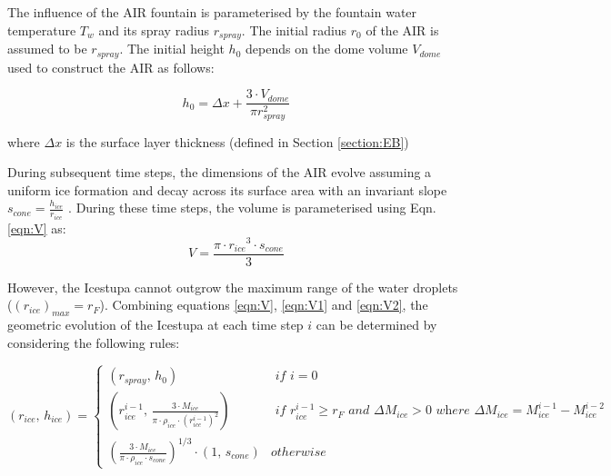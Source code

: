 \documentclass[utf8]{frontiersSCNS} %
\begin{document}
The influence of the AIR fountain is parameterised by the fountain water temperature $T_{w}$ and its spray radius $r_{spray}$.
The initial radius $r_0$ of the AIR is assumed to be $r_{spray}$. The initial height $h_0$ depends on the dome volume
$V_{dome}$ used to construct the AIR as follows:

\begin{equation} 
    h_{0} =  \Delta x + \frac{3 \cdot V_{dome}}{\pi r_{spray}^2 } 
  \end{equation}

where $\Delta x$ is the surface layer thickness (defined in Section \ref{section:EB})

During subsequent time steps, the dimensions of the AIR evolve assuming a uniform ice formation and decay across
its surface area with an invariant slope $s_{cone} = \frac{h_{ice}}{r_{ice}}$ .  During
these time steps, the volume is parameterised using Eqn. \ref{eqn:V} as:\begin{equation} V = \frac{\pi \cdot {r_{ice}}^3
    \cdot s_{cone}}{3} \label{eqn:V2} \end{equation} 


However, the Icestupa cannot outgrow the maximum range of the water droplets ($(r_{ice})_{max} = r_{F}$). Combining
equations \ref{eqn:V}, \ref{eqn:V1} and \ref{eqn:V2}, the geometric evolution of the Icestupa at each time step $i$ can
be determined by considering the following rules:

\begin{equation} (r_{ice},\, h_{ice}) = \left\{ \begin{array}{ll} (r_{spray} ,\, h_0) & \textit{ if } i=0\\
    (r_{ice}^{i-1},\, \frac{3 \cdot M_{ice}}{\pi \cdot \rho_{ice} \cdot {(r_{ice}^{i-1})}^2}) & \textit{ if }
    r_{ice}^{i-1} \geq r_{F} \textit{ and } \Delta M_{ice} > 0 \textit{ where } \Delta M_{ice} = M_{ice}^{i-1} -
    M_{ice}^{i-2}\\ (\frac{3 \cdot M_{ice}}{\pi \cdot \rho_{ice} \cdot s_{cone}})^{1/3} \cdot (1,\,  s_{cone}) &
otherwise \end{array} \right.  \label{eqn:A2} \end{equation}
\end{document}
